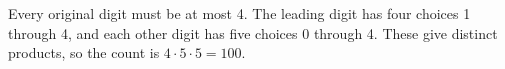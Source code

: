 Every original digit must be at most 4. The leading digit has four choices 1 through 4, and each other digit has five choices 0 through 4. These give distinct products, so the count is $ 4\cdot5\cdot5=\boxed{100}$.
